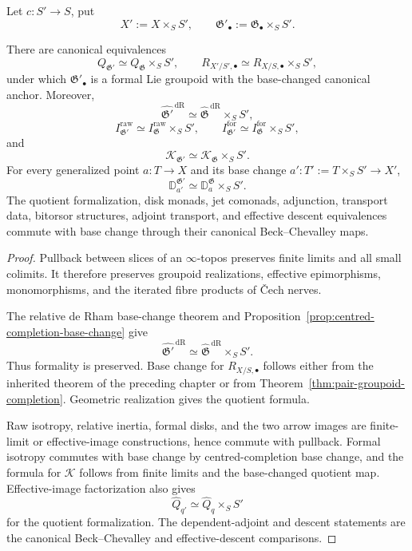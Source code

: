 Let $c:S'\to S$, put
\[
    X':=X\times_SS',
    \qquad
    \mathfrak G'_\bullet
    :=
    \mathfrak G_\bullet\times_SS'.
\]

\begin{theorem}
\label{thm:formal-gpd-base-change}
There are canonical equivalences
\[
    Q_{\mathfrak G'}
    \simeq
    Q_{\mathfrak G}\times_SS',
    \qquad
    R_{X'/S',\bullet}
    \simeq
    R_{X/S,\bullet}\times_SS',
\]
under which $\mathfrak G'_\bullet$ is a formal Lie groupoid with the
base-changed canonical anchor.  Moreover,
\[
    \widehat{\mathfrak G'}^{\,\mathrm{dR}}
    \simeq
    \widehat{\mathfrak G}^{\,\mathrm{dR}}\times_SS',
\]
\[
    I^{\mathrm{raw}}_{\mathfrak G'}
    \simeq
    I^{\mathrm{raw}}_{\mathfrak G}\times_SS',
    \qquad
    I^{\mathrm{for}}_{\mathfrak G'}
    \simeq
    I^{\mathrm{for}}_{\mathfrak G}\times_SS',
\]
and
\[
    \mathcal K_{\mathfrak G'}
    \simeq
    \mathcal K_{\mathfrak G}\times_SS'.
\]
For every generalized point $a:T\to X$ and its base change
$a':T':=T\times_SS'\to X'$,
\[
    \mathbb D^{\mathfrak G'}_{a'}
    \simeq
    \mathbb D^{\mathfrak G}_a\times_SS'.
\]
The quotient formalization, disk monads, jet comonads, adjunction, transport
data, bitorsor structures, adjoint transport, and effective descent
equivalences commute with base change through their canonical
Beck--Chevalley maps.
\end{theorem}

\begin{proof}
Pullback between slices of an $\infty$-topos preserves finite limits and all
small colimits.  It therefore preserves groupoid realizations, effective
epimorphisms, monomorphisms, and the iterated fibre products of \v{C}ech nerves.

The relative de Rham base-change theorem and
Proposition~\ref{prop:centred-completion-base-change} give
\[
    \widehat{\mathfrak G'}^{\,\mathrm{dR}}
    \simeq
    \widehat{\mathfrak G}^{\,\mathrm{dR}}\times_SS'.
\]
Thus formality is preserved.  Base change for $R_{X/S,\bullet}$ follows
either from the inherited theorem of the preceding chapter or from
Theorem~\ref{thm:pair-groupoid-completion}.  Geometric realization gives
the quotient formula.

Raw isotropy, relative inertia, formal disks, and the two arrow images are
finite-limit or effective-image constructions, hence commute with pullback.
Formal isotropy commutes with base change by centred-completion base change,
and the formula for $\mathcal K$ follows from finite limits and the
base-changed quotient map.  Effective-image factorization also gives
\[
    \widehat Q_{q'}
    \simeq
    \widehat Q_q\times_SS'
\]
for the quotient formalization.  The dependent-adjoint and descent
statements are the canonical Beck--Chevalley and effective-descent
comparisons.
\end{proof}


